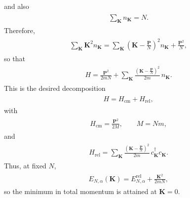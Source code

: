 \documentclass[../QFT_main.tex]{subfiles}
\begin{document}
and also
{\small\begin{align}
\begin{aligned}
    \sum_{\mathbf{K}}n_{\mathbf{K}}=N.
\end{aligned}
\end{align}}
Therefore,
{\small\begin{align}
\begin{aligned}
    \sum_{\mathbf{K}}\mathbf{K}^2 n_{\mathbf{K}}=\sum_{\mathbf{K}}\left(\mathbf{K}-\frac{\mathbf{P}}{N}\right)^2 n_{\mathbf{K}}+\frac{\mathbf{P}^2}{N},
\end{aligned}
\end{align}}
so that
{\small\begin{align}
\begin{aligned}
    H=\frac{\mathbf{P}^2}{2mN}+\sum_{\mathbf{K}}\frac{\left(\mathbf{K}-\frac{\mathbf{P}}{N}\right)^2}{2m}\,n_{\mathbf{K}}.
\end{aligned}
\end{align}}
This is the desired decomposition
{\small\begin{align}
\begin{aligned}
    H=H_{\text{cm}}+H_{\text{rel}},
\end{aligned}
\end{align}}
with
{\small\begin{align}
\begin{aligned}
    H_{\text{cm}}=\frac{\mathbf{P}^2}{2M},\qquad M=Nm,
\end{aligned}
\end{align}}
and
{\small\begin{align}
\begin{aligned}
    H_{\text{rel}}=\sum_{\mathbf{K}}\frac{\left(\mathbf{K}-\frac{\mathbf{P}}{N}\right)^2}{2m}\,c_{\mathbf{K}}^\dagger c_{\mathbf{K}}.
\end{aligned}
\end{align}}
Thus, at fixed $N$,
{\small\begin{align}
\begin{aligned}
    E_{N,\alpha}(\mathbf{K})=E^{\text{rel}}_{N,\alpha}+\frac{\mathbf{K}^2}{2mN},
\end{aligned}
\end{align}}
so the minimum in total momentum is attained at $\mathbf{K}=0$.
\end{document}
